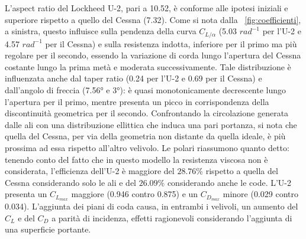 \documentclass{jfm}
\begin{document}
L'aspect ratio del Lockheed U-2, pari a 10.52, è conforme alle ipotesi iniziali e superiore rispetto a quello del Cessna (7.32). Come si nota dalla \figurename \ \ref{fig:coefficienti}, a sinistra, questo influisce sulla pendenza della curva $C_{L/\alpha}$ (5.03 $rad^{-1}$ per l'U-2 e 4.57 $rad^{-1}$ per il Cessna) e sulla resistenza indotta, inferiore per il primo ma più regolare per il secondo, essendo la variazione di corda lungo l'apertura del Cessna costante lungo la prima metà e moderata successivamente. Tale distribuzione è influenzata anche dal taper ratio (0.24 per l'U-2 e 0.69 per il Cessna) e dall'angolo di freccia (7.56° e 3°): è quasi monotonicamente decrescente lungo l'apertura per il primo, mentre presenta un picco in corrispondenza della discontinuità geometrica per il secondo. 
Confrontando la circolazione generata dalle ali con una distribuzione ellittica che induca una pari portanza, si nota che quella del Cessna, per via della geometria non distante da quella ideale, è più prossima ad essa rispetto all'altro velivolo. Le polari riassumono quanto detto: tenendo conto del fatto che in questo modello la resistenza viscosa non è considerata, l'efficienza dell'U-2 è maggiore del $28.76\%$ rispetto a quella del Cessna considerando solo le ali e del $26.09\%$ considerando anche le code. L'U-2 presenta un $C_{L_{max}}$ maggiore (0.946 contro 0.875) e un $C_{D_{max}}$ minore (0.029 contro 0.034). L'aggiunta dei piani di coda causa, in entrambi i velivoli, un aumento del $C_L$ e del $C_D$ a parità di incidenza, effetti ragionevoli considerando l'aggiunta di una superficie portante.

\end{document}
